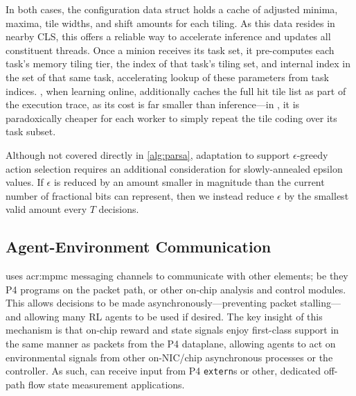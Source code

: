 In both cases, the configuration data struct holds a cache of adjusted minima, maxima, tile widths, and shift amounts for each tiling.
As this data resides in nearby CLS, this offers a reliable way to accelerate inference and updates all constituent threads.
Once a \coopfw{} minion receives its task set, it pre-computes each task's memory tiling tier, the index of that task's tiling set, and internal index in the set of that same task, accelerating lookup of these parameters from task indices.
\Indfw{}, when learning online, additionally caches the full hit tile list as part of the execution trace, as its cost is far smaller than inference---in \Coopfw, it is paradoxically cheaper for each worker to simply repeat the tile coding over its task subset.

Although not covered directly in \cref{alg:parsa}, adaptation to support $\epsilon$-greedy action selection requires an additional consideration for slowly-annealed epsilon values.
If $\epsilon$ is reduced by an amount smaller in magnitude than the current number of fractional bits can represent, then we instead reduce $\epsilon$ by the smallest valid amount every $T$ decisions.


\subsection{Agent-Environment Communication}\label{sec:agent-environment-communication}
\approachshort{} uses \gls{acr:mpmc} messaging channels to communicate with other elements; be they P4 programs on the packet path, or other on-chip analysis and control modules.
This allows decisions to be made asynchronously---preventing packet stalling---and allowing many RL agents to be used if desired.
The key insight of this mechanism is that on-chip reward and state signals enjoy first-class support in the same manner as packets from the P4 dataplane, allowing agents to act on environmental signals from other on-NIC/chip asynchronous processes or the controller.
As such, \approachshort{} can receive input from P4 \texttt{extern}s or other, dedicated off-path flow state measurement applications.

